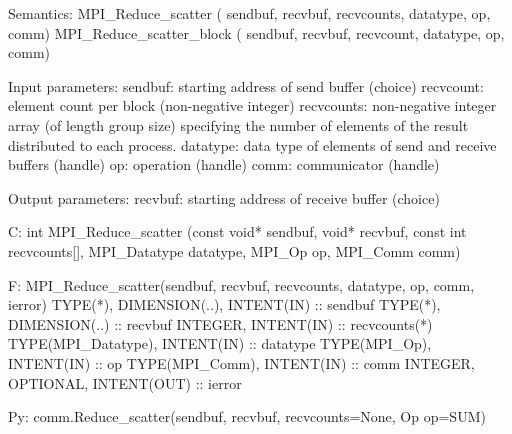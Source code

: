 Semantics:
MPI_Reduce_scatter
   ( sendbuf, recvbuf, recvcounts, datatype, op, comm)
MPI_Reduce_scatter_block
   ( sendbuf, recvbuf, recvcount, datatype, op, comm)

Input parameters:
sendbuf: starting address of send buffer (choice)
recvcount: element count per block (non-negative integer) 
recvcounts: non-negative integer array (of length group size)
    specifying the number of elements of the result distributed to each
    process.
datatype: data type of elements of send and receive buffers (handle)
op: operation (handle)
comm: communicator (handle)

Output parameters:
recvbuf: starting address of receive buffer (choice)

C:
int MPI_Reduce_scatter
   (const void* sendbuf, void* recvbuf, const int recvcounts[],
    MPI_Datatype datatype, MPI_Op op, MPI_Comm comm)

F:
MPI_Reduce_scatter(sendbuf, recvbuf, recvcounts, datatype, op, comm,
ierror)
TYPE(*), DIMENSION(..), INTENT(IN) :: sendbuf
TYPE(*), DIMENSION(..) :: recvbuf
INTEGER, INTENT(IN) :: recvcounts(*)
TYPE(MPI_Datatype), INTENT(IN) :: datatype
TYPE(MPI_Op), INTENT(IN) :: op
TYPE(MPI_Comm), INTENT(IN) :: comm
INTEGER, OPTIONAL, INTENT(OUT) :: ierror

Py:
comm.Reduce_scatter(sendbuf, recvbuf, recvcounts=None, Op op=SUM)
